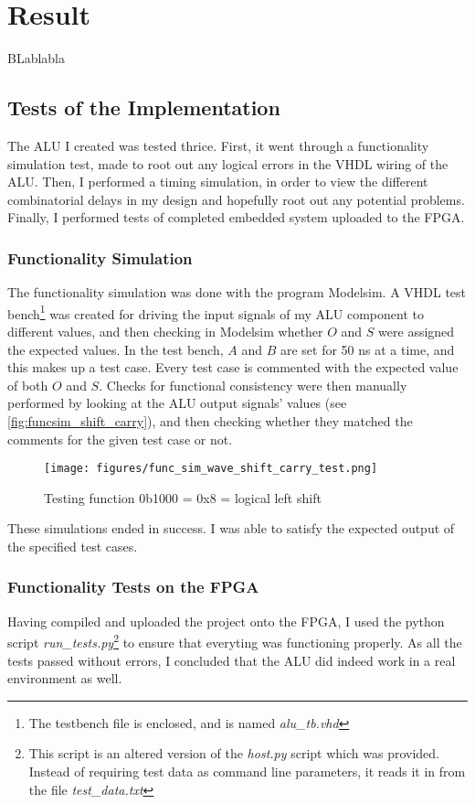 \documentclass{article}
\begin{document}
\section{Result}
\label{sec:result}
BLablabla
\subsection{Tests of the Implementation}
\label{subsec:tests}
The ALU I created was tested thrice. First, it went through a functionality simulation test, made to root out any logical errors in the VHDL wiring of the ALU. Then, I performed a timing simulation, in order to view the different combinatorial delays in my design and hopefully root out any potential problems. Finally, I performed tests of completed embedded system uploaded to the FPGA. 
\subsubsection{Functionality Simulation}
\label{subsubsec:funcsim}
The functionality simulation was done with the program Modelsim. A VHDL test bench\footnote{The testbench file is enclosed, and is named \emph{alu\_tb.vhd}} was created for driving the input signals of my ALU component to different values, and then checking in Modelsim whether $O$ and $S$ were assigned the expected values. In the test bench, $A$ and $B$ are set for 50 ns at a time, and this makes up a test case. Every test case is commented with the expected value of both $O$ and $S$. Checks for functional consistency were then manually performed by looking at the ALU output signals' values (see \autoref{fig:funcsim_shift_carry}), and then checking whether they matched the comments for the given test case or not. 
\begin{figure}[htbp]
  \centering
  \texttt{[image: figures/func\_sim\_wave\_shift\_carry\_test.png]}
  \caption{\label{fig:funcsim_shift_carry} Testing function 0b1000 = 0x8 = logical left shift}
\end{figure}

These simulations ended in success. I was able to satisfy the expected output of the specified test cases.


\subsubsection{Functionality Tests on the FPGA}
\label{subsubsec:funcfpga}
Having compiled and uploaded the project onto the FPGA, I used the python script \emph{run\_tests.py}\footnote{This script is an altered version of the \emph{host.py} script which was provided. Instead of requiring test data as command line parameters, it reads it in from the file \emph{test\_data.txt}} to ensure that everyting was functioning properly. As all the tests passed without errors, I concluded that the ALU did indeed work in a real environment as well.
\end{document}
